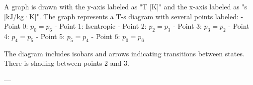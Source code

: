 A graph is drawn with the y-axis labeled as "T [K]" and the x-axis labeled as "s [kJ/kg·K]". The graph represents a T-s diagram with several points labeled:  
- Point 0: \( p_0 = p_6 \)  
- Point 1: Isentropic  
- Point 2: \( p_2 = p_3 \)  
- Point 3: \( p_3 = p_2 \)  
- Point 4: \( p_4 = p_5 \)  
- Point 5: \( p_5 = p_4 \)  
- Point 6: \( p_0 = p_6 \)  

The diagram includes isobars and arrows indicating transitions between states. There is shading between points 2 and 3.  

---